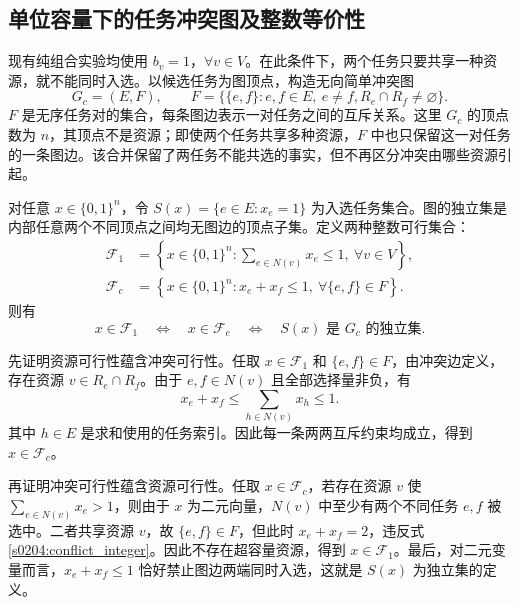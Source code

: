 \subsection{单位容量下的任务冲突图及整数等价性}

现有纯组合实验均使用 $b_v=1$，$\forall v\in V$。在此条件下，两个任务只要共享一种资源，就不能同时入选。以候选任务为图顶点，构造无向简单冲突图
\begin{equation}
 G_c=(E,F),
 \qquad
 F=\bigl\{\{e,f\}:e,f\in E,\ e\ne f,
 R_e\cap R_f\ne\varnothing\bigr\}.
 \label{s0204:conflict_graph}
\end{equation}
$F$ 是无序任务对的集合，每条图边表示一对任务之间的互斥关系。这里 $G_c$ 的顶点数为 $n$，其顶点不是资源；即使两个任务共享多种资源，$F$ 中也只保留这一对任务的一条图边。该合并保留了两任务不能共选的事实，但不再区分冲突由哪些资源引起。

对任意 $x\in\{0,1\}^{n}$，令 $S(x)=\{e\in E:x_e=1\}$ 为入选任务集合。图的独立集是内部任意两个不同顶点之间均无图边的顶点子集。定义两种整数可行集合：
\begin{align}
 \mathcal F_1
 &=\left\{x\in\{0,1\}^{n}:
 \sum_{e\in N(v)}x_e\leq1,\ \forall v\in V\right\},
 \label{s0204:resource_integer}\\
 \mathcal F_c
 &=\left\{x\in\{0,1\}^{n}:
 x_e+x_f\leq1,\ \forall\{e,f\}\in F\right\}.
 \label{s0204:conflict_integer}
\end{align}
则有
\begin{equation}
 x\in\mathcal F_1
 \quad\Longleftrightarrow\quad
 x\in\mathcal F_c
 \quad\Longleftrightarrow\quad
 S(x)\text{ 是 }G_c\text{ 的独立集}.
 \label{s0204:integer_equivalence}
\end{equation}

先证明资源可行性蕴含冲突可行性。任取 $x\in\mathcal F_1$ 和 $\{e,f\}\in F$，由冲突边定义，存在资源 $v\in R_e\cap R_f$。由于 $e,f\in N(v)$ 且全部选择量非负，有
\begin{equation}
 x_e+x_f\leq\sum_{h\in N(v)}x_h\leq1.
 \label{s0204:resource_implies_pair}
\end{equation}
其中 $h\in E$ 是求和使用的任务索引。因此每一条两两互斥约束均成立，得到 $x\in\mathcal F_c$。

再证明冲突可行性蕴含资源可行性。任取 $x\in\mathcal F_c$，若存在资源 $v$ 使 $\sum_{e\in N(v)}x_e>1$，则由于 $x$ 为二元向量，$N(v)$ 中至少有两个不同任务 $e,f$ 被选中。二者共享资源 $v$，故 $\{e,f\}\in F$，但此时 $x_e+x_f=2$，违反式\eqref{s0204:conflict_integer}。因此不存在超容量资源，得到 $x\in\mathcal F_1$。最后，对二元变量而言，$x_e+x_f\leq1$ 恰好禁止图边两端同时入选，这就是 $S(x)$ 为独立集的定义。

